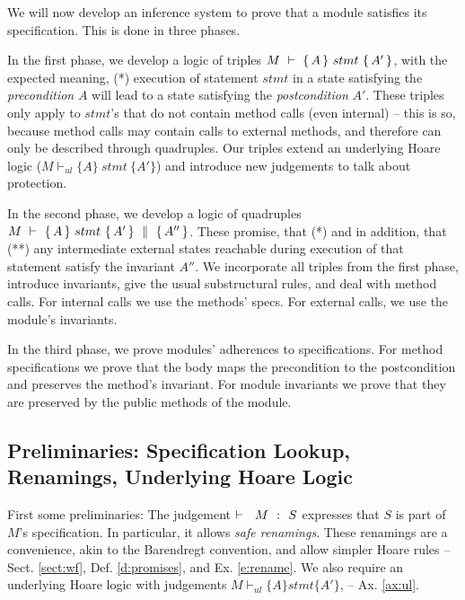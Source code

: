 We will now develop an inference system to prove that a module %
satisfies its specification. This is done in three phases.

In the first phase, we develop a logic of triples ${M\ \vdash\ \{\,A\, \} \ stmt\  \{\,A'\, \} }$,  with %
the expected meaning, \ie 
(*) execution of statement $stmt$ in a state satisfying {the \emph{precondition}}  $A$ will lead to a state satisfying  {the \emph{postcondition}}  $A'$.
These triples only apply to   $stmt$'s  that  do not contain method calls  (even internal) -- this is so, because method calls may contain calls to external methods, and therefore can only be described through quadruples.
Our triples extend an underlying Hoare logic  (${M \vdash_{ul}  \{A\} {\ stmt\ } \{A'\} }$) and  introduce new judgements to %
talk about protection.

In the second phase, we develop a logic of quadruples ${M\ \vdash\ \{\,A\, \} \ stmt\  \{\,A'\, \}\, \,\parallel\,\, \{\, A'' \, \}}$. These promise,  that (*) and  
in addition,   that (**) any intermediate external states reachable during execution of that statement %
 satisfy the invariant  $A''$.  
 We incorporate all triples from the first phase,       
introduce invariants, give the usual substructural rules, and deal with method calls. 
For internal   calls we use the methods' specs. %
For external   calls, we   use %
 the module's invariants. 
 
In the third phase, we prove modules' adherences to  specifications. 
For method specifications we prove that the body maps the precondition to the postcondition and preserves the method's invariant. 
For module invariants we prove that they  are preserved by the public methods of the module.



\subsection{Preliminaries: Specification Lookup,  Renamings, Underlying Hoare Logic}

First some preliminaries: %
The judgement    ${\vdash \ \ M\ \ \mathbf{:}\ \ S}$ expresses that $S$ is part of $M$'s specification.  
In particular, it allows   \emph{safe  renamings}. 
These renamings are   a convenience, akin to the Barendregt convention, and  allow simpler Hoare rules  -- \cf Sect. \ref{sect:wf},
Def. \ref{d:promises}, and Ex. \ref{e:rename}. We also require an underlying Hoare logic with judgements $M \vdash_{ul} \{ A \} stmt \{ A' \}$, 
-- \cf Ax. \ref{ax:ul}.



